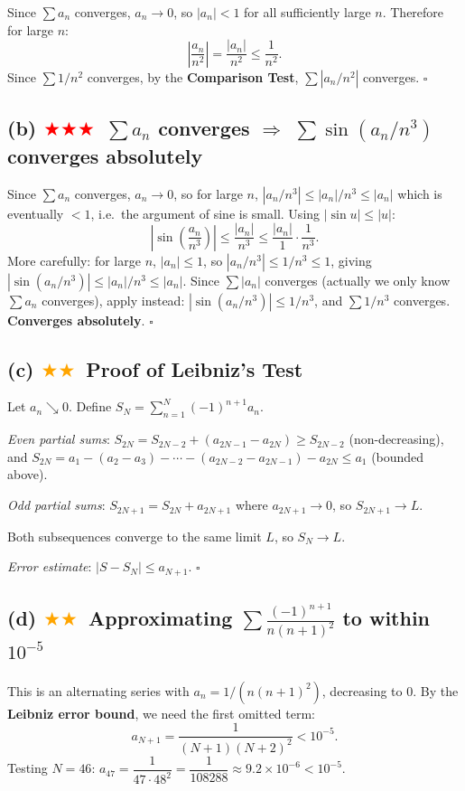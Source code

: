 \documentclass[12pt,a4paper]{article}
\newcommand{\medium}{\textcolor{orange}{$\bigstar\bigstar$}}
\newcommand{\hard}{\textcolor{red}{$\bigstar\bigstar\bigstar$}}
\begin{document}
Since $\sum a_n$ converges, $a_n\to 0$, so $|a_n|<1$ for all sufficiently large $n$.  Therefore for large $n$:
\[
  \left|\frac{a_n}{n^2}\right| = \frac{|a_n|}{n^2} \leq \frac{1}{n^2}.
\]
Since $\sum 1/n^2$ converges, by the \textbf{Comparison Test}, $\sum |a_n/n^2|$ converges.  $\square$

\subsection*{(b) \hard\ $\sum a_n$ converges $\Rightarrow$ $\sum \sin(a_n/n^3)$ converges absolutely}

Since $\sum a_n$ converges, $a_n\to 0$, so for large $n$, $|a_n/n^3|\leq |a_n|/n^3 \leq |a_n|$ which is eventually $< 1$, i.e.\ the argument of sine is small.  Using $|\sin u|\leq |u|$:
\[
  \left|\sin\!\left(\frac{a_n}{n^3}\right)\right| \leq \frac{|a_n|}{n^3} \leq \frac{|a_n|}{1} \cdot \frac{1}{n^3}.
\]
More carefully: for large $n$, $|a_n|\leq 1$, so $|a_n/n^3|\leq 1/n^3\leq 1$, giving $|\sin(a_n/n^3)|\leq |a_n|/n^3\leq |a_n|$.  Since $\sum|a_n|$ converges (actually we only know $\sum a_n$ converges), apply instead: $|\sin(a_n/n^3)|\leq 1/n^3$, and $\sum 1/n^3$ converges.  \textbf{Converges absolutely}. $\square$

\subsection*{(c) \medium\ Proof of Leibniz's Test}

Let $a_n\searrow 0$.  Define $S_N=\sum_{n=1}^N(-1)^{n+1}a_n$.

\textit{Even partial sums}: $S_{2N}=S_{2N-2}+(a_{2N-1}-a_{2N})\geq S_{2N-2}$ (non-decreasing), and $S_{2N}=a_1-(a_2-a_3)-\cdots-(a_{2N-2}-a_{2N-1})-a_{2N}\leq a_1$ (bounded above).

\textit{Odd partial sums}: $S_{2N+1}=S_{2N}+a_{2N+1}$ where $a_{2N+1}\to 0$, so $S_{2N+1}\to L$.

Both subsequences converge to the same limit $L$, so $S_N\to L$.

\textit{Error estimate}: $|S-S_N|\leq a_{N+1}$.  $\square$

\subsection*{(d) \medium\ Approximating $\sum\frac{(-1)^{n+1}}{n(n+1)^2}$ to within $10^{-5}$}

This is an alternating series with $a_n=1/(n(n+1)^2)$, decreasing to $0$.  By the \textbf{Leibniz error bound}, we need the first omitted term:
\[
  a_{N+1} = \frac{1}{(N+1)(N+2)^2} < 10^{-5}.
\]
Testing $N=46$: $a_{47}=\dfrac{1}{47\cdot 48^2}=\dfrac{1}{108288}\approx 9.2\times 10^{-6}<10^{-5}$.
\end{document}
